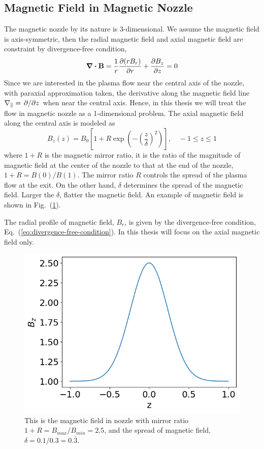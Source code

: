 \subsection{Magnetic Field in Magnetic Nozzle} \label{sec:magnetic-field-in-nozzle}
The magnetic nozzle by its nature is 3-dimensional. We assume the magnetic field is axis-symmetric, then the radial magnetic field and axial magnetic field are constraint by divergence-free condition,
\begin{equation}
	\div\mathbf{B} = \frac{1}{r}\pdv{(rB_r)}{r} + \pdv{B_z}{z} = 0
	\label{eq:divergence-free-condition}
\end{equation}
Since we are interested in the plasma flow near the central axis of the nozzle, with paraxial approximation taken, the derivative along the magnetic field line $\nabla_\parallel = \pdv*{z}$ when near the central axis. \cite{smolyakov_quasineutral_2021} Hence, in this thesis we will treat the flow in magnetic nozzle as a 1-dimensional problem. The axial magnetic field along the central axis is modeled as
\begin{equation}
	B_z(z) = B_0 \left[1 + R\exp(-\left(\frac{z}{\delta}\right)^2)\right], \quad -1\leq z \leq 1
\end{equation}
where $1+R$ is the magnetic mirror ratio, it is the ratio of the magnitude of magnetic field at the center of the nozzle to that at the end of the nozzle, $1+R = B(0)/B(1)$. The mirror ratio $R$ controls the spread of the plasma flow at the exit. On the other hand, $\delta$ determines the spread of the magnetic field. Larger the $\delta$, flatter the magnetic field. An example of magnetic field is shown in Fig.~(\ref{fig:magnetic-field}).

The radial profile of magnetic field, $B_r$, is given by the divergence-free condition, Eq.~(\ref{eq:divergence-free-condition}). In this thesis will focus on the axial magnetic field only.

\begin{figure}[htbp]
	\centering
	\includegraphics[width=0.7\linewidth]{figures/magnetic-field}
	\caption{This is the magnetic field in nozzle with mirror ratio $1+R=B_{max}/B_{min}=2.5$, and the spread of magnetic field, $\delta=0.1/0.3=0.\bar{3}$. }
	\label{fig:magnetic-field}
\end{figure}

